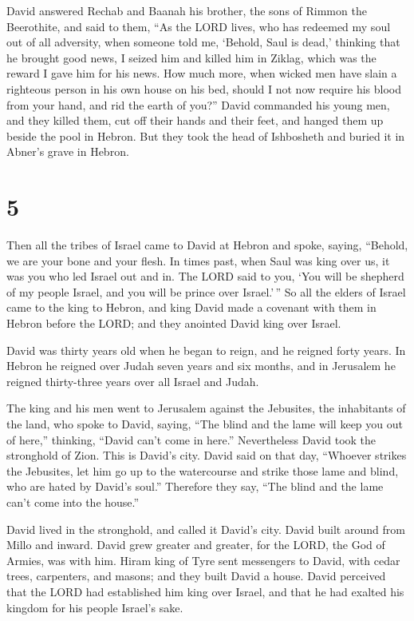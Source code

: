  David answered Rechab and Baanah his brother, the sons of
Rimmon the Beerothite, and said to them, ``As the LORD lives, who has
redeemed my soul out of all adversity,  when someone told
me, `Behold, Saul is dead,' thinking that he brought good news, I seized
him and killed him in Ziklag, which was the reward I gave him for his
news.  How much more, when wicked men have slain a
righteous person in his own house on his bed, should I not now require
his blood from your hand, and rid the earth of you?'' 
David commanded his young men, and they killed them, cut off their hands
and their feet, and hanged them up beside the pool in Hebron. But they
took the head of Ishbosheth and buried it in Abner's grave in Hebron.

\hypertarget{section-4}{%
\section{5}\label{section-4}}

 Then all the tribes of Israel came to David at Hebron and
spoke, saying, ``Behold, we are your bone and your flesh. 
In times past, when Saul was king over us, it was you who led Israel out
and in. The LORD said to you, `You will be shepherd of my people Israel,
and you will be prince over Israel.'\,''  So all the elders
of Israel came to the king to Hebron, and king David made a covenant
with them in Hebron before the LORD; and they anointed David king over
Israel.

 David was thirty years old when he began to reign, and he
reigned forty years.  In Hebron he reigned over Judah seven
years and six months, and in Jerusalem he reigned thirty-three years
over all Israel and Judah.

 The king and his men went to Jerusalem against the
Jebusites, the inhabitants of the land, who spoke to David, saying,
``The blind and the lame will keep you out of here,'' thinking, ``David
can't come in here.''  Nevertheless David took the
stronghold of Zion. This is David's city.  David said on
that day, ``Whoever strikes the Jebusites, let him go up to the
watercourse and strike those lame and blind, who are hated by David's
soul.'' Therefore they say, ``The blind and the lame can't come into the
house.''

 David lived in the stronghold, and called it David's city.
David built around from Millo and inward.  David grew
greater and greater, for the LORD, the God of Armies, was with him.
 Hiram king of Tyre sent messengers to David, with cedar
trees, carpenters, and masons; and they built David a house.
 David perceived that the LORD had established him king
over Israel, and that he had exalted his kingdom for his people Israel's
sake.

